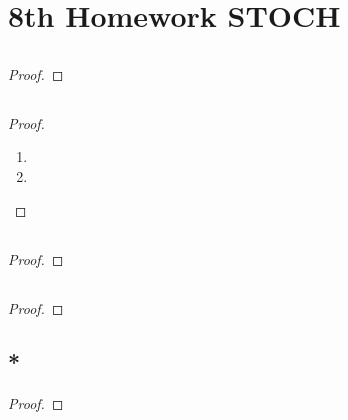 
\section{8th Homework STOCH}
\subsection{}
\begin{solution}
	
\end{solution}

\subsection{}
\begin{proof}
	
\end{proof}
\subsection{}
\begin{proof}
	\begin{enumerate}
		\item 
		\item 
	\end{enumerate}
\end{proof}
\subsection{}
\begin{proof}
	
\end{proof}

\subsection{}
\begin{proof}
	
\end{proof}

\subsection{*}
\begin{proof}
	
\end{proof}